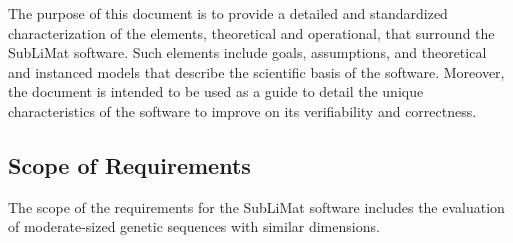 \documentclass[12pt]{article}
\begin{document}
The purpose of this document is to provide a detailed and standardized characterization of 
the elements, theoretical and operational, that surround the SubLiMat software. Such 
elements include goals, assumptions, and theoretical and instanced models that describe 
the scientific basis of the software. Moreover, the document is intended to be used as a guide to detail 
the unique characteristics of the software to improve on its verifiability and correctness. 


\subsection{Scope of Requirements} 

The scope of the requirements for the SubLiMat software includes the evaluation of 
moderate-sized genetic sequences with similar dimensions. 


\end{document}
